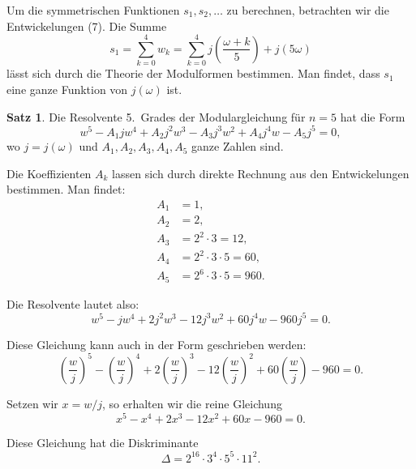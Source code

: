 \documentclass[12pt,a4paper]{article}
\theoremstyle{definition}
\newtheorem*{satz}{Satz}
\begin{document}
Um die symmetrischen Funktionen $s_1, s_2, \ldots$ zu berechnen,
betrachten wir die Entwickelungen (7). Die Summe
\begin{equation}\tag{8}
s_1 = \sum_{k=0}^{4} w_k = \sum_{k=0}^{4} j\left(\frac{\omega+k}{5}\right) + j(5\omega)
\end{equation}
l\"asst sich durch die Theorie der Modulformen bestimmen. Man
findet, dass $s_1$ eine ganze Funktion von $j(\omega)$ ist.

\begin{satz}
Die Resolvente 5.~Grades der Modulargleichung f\"ur $n = 5$
hat die Form
\begin{equation}\tag{9}
w^5 - A_1 j w^4 + A_2 j^2 w^3 - A_3 j^3 w^2 + A_4 j^4 w - A_5 j^5 = 0,
\end{equation}
wo $j = j(\omega)$ und $A_1, A_2, A_3, A_4, A_5$ ganze Zahlen sind.
\end{satz}

Die Koeffizienten $A_k$ lassen sich durch direkte Rechnung
aus den Entwickelungen bestimmen. Man findet:
\begin{equation}\tag{10}
\begin{aligned}
A_1 &= 1, \\
A_2 &= 2, \\
A_3 &= 2^2 \cdot 3 = 12, \\
A_4 &= 2^2 \cdot 3 \cdot 5 = 60, \\
A_5 &= 2^6 \cdot 3 \cdot 5 = 960.
\end{aligned}
\end{equation}

Die Resolvente lautet also:
\begin{equation}\tag{11}
w^5 - j w^4 + 2j^2 w^3 - 12j^3 w^2 + 60j^4 w - 960j^5 = 0.
\end{equation}

Diese Gleichung kann auch in der Form geschrieben werden:
\begin{equation}\tag{12}
\left(\frac{w}{j}\right)^5 - \left(\frac{w}{j}\right)^4 + 2\left(\frac{w}{j}\right)^3 - 12\left(\frac{w}{j}\right)^2 + 60\left(\frac{w}{j}\right) - 960 = 0.
\end{equation}

Setzen wir $x = w/j$, so erhalten wir die reine Gleichung
\begin{equation}\tag{13}
x^5 - x^4 + 2x^3 - 12x^2 + 60x - 960 = 0.
\end{equation}

Diese Gleichung hat die Diskriminante
\begin{equation}\tag{14}
\Delta = 2^{16} \cdot 3^4 \cdot 5^5 \cdot 11^2.
\end{equation}
\end{document}

